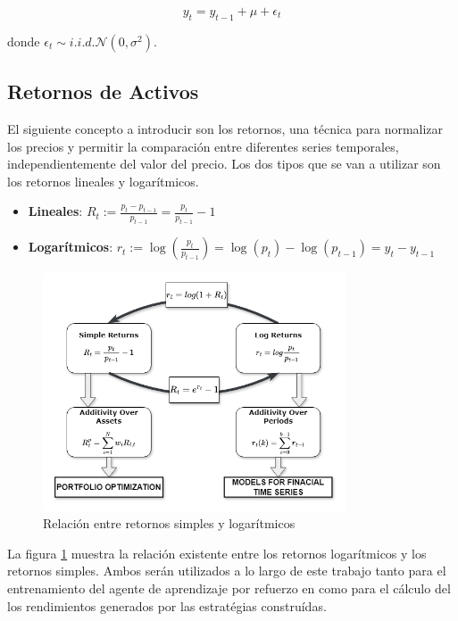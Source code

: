 \documentclass[a4paper,12pt, twoside]{report}
\begin{document}
\[
y_t = y_{t-1} + \mu + \epsilon_t
\]

donde $\epsilon_t \sim i.i.d. \mathcal{N}(0, \sigma^2)$.

\subsection{Retornos de Activos}

El siguiente concepto a introducir son los retornos, una técnica para normalizar los precios y permitir la comparación 
entre diferentes series temporales, independientemente del valor del precio. Los dos tipos que se van a utilizar son 
los retornos lineales y logarítmicos.

\begin{itemize}
    \item \textbf{Lineales}: $R_t := \frac{p_t - p_{t-1}}{p_{t-1}} = \frac{p_t}{p_{t-1}} - 1$
    \item \textbf{Logarítmicos}: $r_t := \log\left(\frac{p_t}{p_{t-1}}\right) = \log(p_t) - \log(p_{t-1}) = y_t - y_{t-1}$
\end{itemize}

\begin{figure}[H]
    \centering
    \includegraphics[width=0.8\textwidth]{figures/simple_and_log_ret_relation.png}
    \caption{Relación entre retornos simples y logarítmicos}
    \label{fig:log-returns}
\end{figure}

La figura \ref{fig:log-returns} muestra la relación existente entre los retornos logarítmicos y los retornos simples.
Ambos serán utilizados a lo largo de este trabajo tanto para el entrenamiento del agente de aprendizaje por refuerzo en
como para el cálculo del los rendimientos generados por las estratégias construídas.
\end{document}
